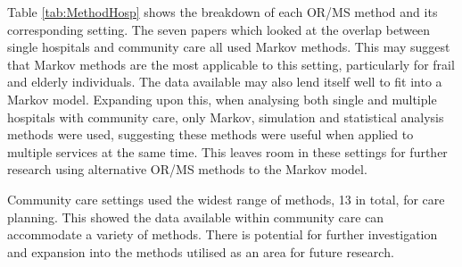 \documentclass[../thesis.tex]{subfiles}
\begin{document}
Table \ref{tab:MethodHosp} shows the breakdown of each OR/MS method and its corresponding setting. The seven papers which looked at the overlap between single hospitals and community care all used Markov methods. This may suggest that Markov methods are the most applicable to this setting, particularly for frail and elderly individuals. The data available may also lend itself well to fit into a Markov model. Expanding upon this, when analysing both single and multiple hospitals with community care, only Markov, simulation and statistical analysis methods were used, suggesting these methods were useful when applied to multiple services at the same time. This leaves room in these settings for further research using alternative OR/MS methods to the Markov model. 

Community care settings used the widest range of methods, 13 in total, for care planning. This showed the data available within community care can accommodate a variety of methods. There is potential for further investigation and expansion into the methods utilised as an area for future research.
\end{document}
